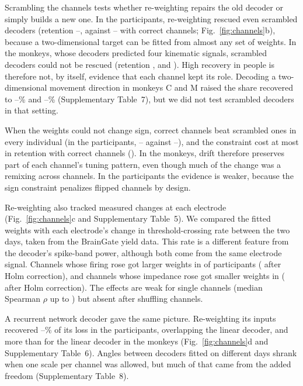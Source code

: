 \documentclass[pdflatex,sn-nature]{sn-jnl}
\begin{document}
Scrambling the channels tests whether re-weighting repairs the old decoder or simply builds a new one. In the
participants, re-weighting rescued even scrambled decoders (retention --,
against -- with correct channels; Fig.~\ref{fig:channels}b), because a
two-dimensional target can be fitted from almost any set of weights. In the monkeys, whose decoders predicted four
kinematic signals, scrambled decoders could not be rescued (retention ,  and
). High recovery in people is therefore not, by itself, evidence that each channel kept its role.
Decoding a two-dimensional movement direction in monkeys C and M raised the share recovered to
--\% and --\% (Supplementary Table~7), but we
did not test scrambled decoders in that setting.

When the weights could not change sign, correct channels beat scrambled ones in every individual (in the participants,
-- against
--), and the constraint cost at most
 in retention with correct channels (). In the monkeys, drift
therefore preserves part of each channel's tuning pattern, even though much of the change was a remixing across
channels. In the participants the evidence is weaker, because the sign
constraint penalizes flipped channels by design.

Re-weighting also tracked measured changes at each electrode (Fig.~\ref{fig:channels}c and Supplementary Table~5). We
compared the fitted weights with each electrode's change in threshold-crossing rate between the two days, taken from the
BrainGate yield data. This rate is a different feature from the decoder's spike-band power, although both come from the
same electrode signal. Channels whose firing rose got larger weights in  of
 participants ( after Holm correction), and channels whose
impedance rose got smaller weights in  ( after Holm correction).
The effects are weak for single channels (median Spearman $\rho$ up to ) but absent after
shuffling channels.

A recurrent network decoder gave the same picture. Re-weighting its inputs recovered
--\% of its loss in the participants, overlapping the linear decoder, and more
than for the linear decoder in the monkeys (Fig.~\ref{fig:channels}d and Supplementary Table~6). Angles between decoders
fitted on different days shrank when one scale per channel was allowed, but much of that came from the added freedom
(Supplementary Table~8).
\end{document}
